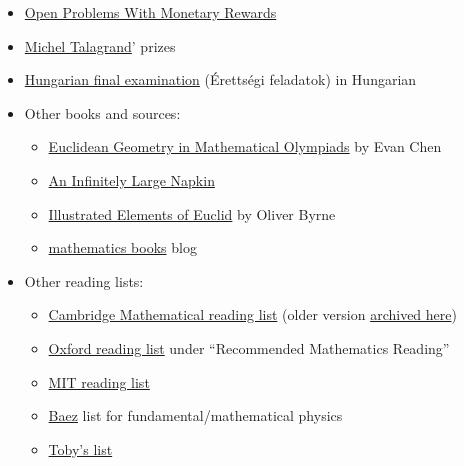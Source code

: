 \documentclass{article}
\begin{document}
\begin{itemize}
    \item \href{https://mathoverflow.net/questions/66084/open-problems-with-monetary-rewards}{Open Problems With Monetary Rewards}

    \item \href{https://michel.talagrand.net/prizes/}{Michel Talagrand}' prizes
    
    \item \href{https://matek.fazekas.hu/index.php?option=com_content&view=article&id=156&Itemid=217}{Hungarian final examination} (Érettségi feladatok) in Hungarian
    
    \item Other books and sources:
    \begin{itemize}
        \item \href{https://web.evanchen.cc/geombook.html}{Euclidean Geometry in Mathematical Olympiads} by Evan Chen
        \item \href{https://web.evanchen.cc/napkin.html}{An Infinitely Large Napkin}
        \item \href{https://publicdomainreview.org/collection/the-first-six-books-of-the-elements-of-euclid-1847}{Illustrated Elements of Euclid} by Oliver Byrne 
        \item \href{https://mathematicalolympiads.wordpress.com/}{mathematics books} blog
    \end{itemize}
    
    \item Other reading lists:
    \begin{itemize}
        \item \href{https://www.maths.cam.ac.uk/undergrad/admissions/files/admissions/reading-list.pdf}{Cambridge Mathematical reading list}  (older version \href{https://web.archive.org/web/20210618105354/https://www.maths.cam.ac.uk/undergrad/admissions/files/reading-list.pdf}{archived here})
        \item \href{https://www.maths.ox.ac.uk/study-here/undergraduate-study/prospectus}{Oxford reading list} under ``Recommended Mathematics Reading''
        \item \href{https://math.mit.edu/research/highschool/primes/reading.php}{MIT reading list}
        \item \href{http://math.ucr.edu/home/baez/books.html}{Baez} list for fundamental/mathematical physics
        \item \href{https://www.youtube.com/watch?v=I_Df_mx8Hxo}{Toby's list}
    \end{itemize}
    

\end{itemize}
\end{document}
